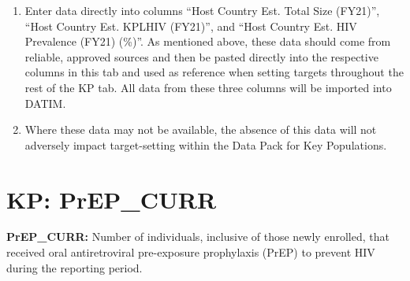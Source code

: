 \documentclass[
  openany]{book}
\begin{document}
\begin{enumerate}
\def\labelenumi{\arabic{enumi}.}
\item
  Enter data directly into columns ``Host Country Est. Total Size
  (FY21)'', ``Host Country Est. KPLHIV (FY21)'', and ``Host Country Est.
  HIV Prevalence (FY21) (\%)''. As mentioned above, these data should
  come from reliable, approved sources and then be pasted directly
  into the respective columns in this tab and used as reference when
  setting targets throughout the rest of the KP tab. All data from
  these three columns will be imported into DATIM.
\item
  Where these data may not be available, the absence of this data will
  not adversely impact target-setting within the Data Pack for Key
  Populations.
\end{enumerate}

\textbf{\hfill\break
}

\hypertarget{kp-prep_curr}{%
\section{KP: PrEP\_CURR}\label{kp-prep_curr}}

\textbf{PrEP\_CURR:} Number of individuals, inclusive of those newly enrolled,
that received oral antiretroviral pre-exposure prophylaxis (PrEP) to
prevent HIV during the reporting period.

\begin{table}[H]
\centering\begingroup\fontsize{12}{14}\selectfont

\endgroup{}
\end{table}
\end{document}
